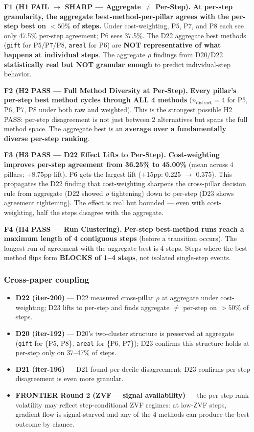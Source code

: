 \textbf{F1 (H1 FAIL $\rightarrow$ SHARP --- Aggregate $\neq$ Per-Step).}
\textbf{At per-step granularity, the aggregate best-method-per-pillar
agrees with the per-step best on $< 50\%$ of steps.} Under cost-weighting,
P5, P7, and P8 each see only 47.5\% per-step agreement; P6 sees 37.5\%.
The D22 aggregate best methods (\texttt{gift} for P5/P7/P8, \texttt{areal}
for P6) are \textbf{NOT representative of what happens at individual steps}.
The aggregate $\rho$ findings from D20/D22 \textbf{statistically real but
NOT granular enough} to predict individual-step behavior.

\textbf{F2 (H2 PASS --- Full Method Diversity at Per-Step).}
\textbf{Every pillar's per-step best method cycles through ALL 4 methods}
($n_{\mathrm{distinct}}=4$ for P5, P6, P7, P8 under both raw and weighted).
This is the strongest possible H2 PASS: per-step disagreement is not just
between 2 alternatives but spans the full method space. The aggregate best
is an \textbf{average over a fundamentally diverse per-step ranking}.

\textbf{F3 (H3 PASS --- D22 Effect Lifts to Per-Step).}
\textbf{Cost-weighting improves per-step agreement from 36.25\% to 45.00\%}
(mean across 4 pillars; +8.75pp lift). P6 gets the largest lift (+15pp:
0.225 $\to$ 0.375). This propagates the D22 finding that cost-weighting
sharpens the cross-pillar decision rule from aggregate (D22 showed $\rho$
tightening) down to per-step (D23 shows agreement tightening). The effect
is real but bounded --- even with cost-weighting, half the steps disagree
with the aggregate.

\textbf{F4 (H4 PASS --- Run Clustering).}
\textbf{Per-step best-method runs reach a maximum length of 4 contiguous
steps} (before a transition occurs). The longest run of agreement with
the aggregate best is 4 steps. Steps where the best-method flips form
\textbf{BLOCKS of 1--4 steps}, not isolated single-step events.

\subsubsection{Cross-paper coupling}\label{sec:synth-d23-coupling}

\begin{itemize}
\item \textbf{D22 (iter-200)} --- D22 measured cross-pillar $\rho$ at
  aggregate under cost-weighting; D23 lifts to per-step and finds
  aggregate $\neq$ per-step on $> 50\%$ of steps.
\item \textbf{D20 (iter-192)} --- D20's two-cluster structure is preserved
  at aggregate (\texttt{gift} for \{P5, P8\}, \texttt{areal} for \{P6, P7\});
  D23 confirms this structure holds at per-step only on 37--47\% of steps.
\item \textbf{D21 (iter-196)} --- D21 found per-decile disagreement;
  D23 confirms per-step disagreement is even more granular.
\item \textbf{FRONTIER Round 2 (ZVF = signal availability)} --- the
  per-step rank volatility may reflect step-conditional ZVF regimes:
  at low-ZVF steps, gradient flow is signal-starved and any of the
  4 methods can produce the best outcome by chance.
\end{itemize}

